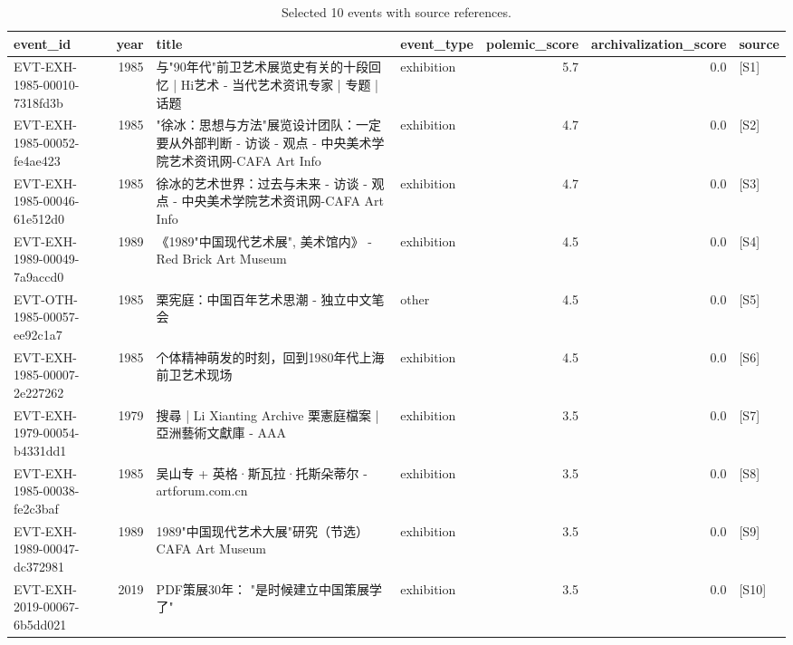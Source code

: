\begin{table}[ht]
\centering
\small
\begin{tabular}{l | r | l | l | r | r | l}
\hline
event\_id & year & title & event\_type & polemic\_score & archivalization\_score & source \\
\hline
EVT-EXH-1985-00010-7318fd3b & 1985 & 与"90年代"前卫艺术展览史有关的十段回忆 | Hi艺术 - 当代艺术资讯专家 | 专题 | 话题 & exhibition & 5.7 & 0.0 & [S1] \\
EVT-EXH-1985-00052-fe4ae423 & 1985 & "徐冰：思想与方法"展览设计团队：一定要从外部判断 - 访谈 - 观点 - 中央美术学院艺术资讯网-CAFA Art Info & exhibition & 4.7 & 0.0 & [S2] \\
EVT-EXH-1985-00046-61e512d0 & 1985 & 徐冰的艺术世界：过去与未来 - 访谈 - 观点 - 中央美术学院艺术资讯网-CAFA Art Info & exhibition & 4.7 & 0.0 & [S3] \\
EVT-EXH-1989-00049-7a9accd0 & 1989 & 《1989"中国现代艺术展", 美术馆内》 - Red Brick Art Museum & exhibition & 4.5 & 0.0 & [S4] \\
EVT-OTH-1985-00057-ee92c1a7 & 1985 & 栗宪庭：中国百年艺术思潮 - 独立中文笔会 & other & 4.5 & 0.0 & [S5] \\
EVT-EXH-1985-00007-2e227262 & 1985 & 个体精神萌发的时刻，回到1980年代上海前卫艺术现场 & exhibition & 4.5 & 0.0 & [S6] \\
EVT-EXH-1979-00054-b4331dd1 & 1979 & 搜尋 | Li Xianting Archive 栗憲庭檔案 | 亞洲藝術文獻庫 - AAA & exhibition & 3.5 & 0.0 & [S7] \\
EVT-EXH-1985-00038-fe2c3baf & 1985 & 吴山专 + 英格·斯瓦拉·托斯朵蒂尔 - artforum.com.cn & exhibition & 3.5 & 0.0 & [S8] \\
EVT-EXH-1989-00047-dc372981 & 1989 & 1989"中国现代艺术大展"研究（节选） CAFA Art Museum & exhibition & 3.5 & 0.0 & [S9] \\
EVT-EXH-2019-00067-6b5dd021 & 2019 & PDF策展30年： "是时候建立中国策展学了" & exhibition & 3.5 & 0.0 & [S10] \\
\hline
\end{tabular}

\caption{Selected 10 events with source references.}
\end{table}

